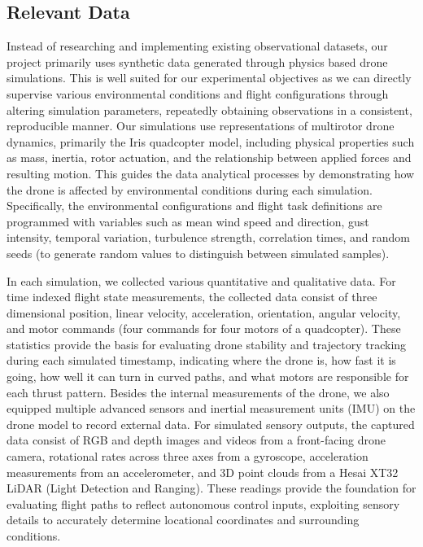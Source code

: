 \documentclass[12pt,letterpaper]{article}
\begin{document}
\subsection{Relevant Data}
Instead of researching and implementing existing observational datasets, our project primarily uses synthetic data generated through physics based drone simulations. This is well suited for our experimental objectives as we can directly supervise various environmental conditions and flight configurations through altering simulation parameters, repeatedly obtaining observations in a consistent, reproducible manner. Our simulations use representations of multirotor drone dynamics, primarily the Iris quadcopter model, including physical properties such as mass, inertia, rotor actuation, and the relationship between applied forces and resulting motion. This guides the data analytical processes by demonstrating how the drone is affected by environmental conditions during each simulation. Specifically, the environmental configurations and flight task definitions are programmed with variables such as mean wind speed and direction, gust intensity, temporal variation, turbulence strength, correlation times, and random seeds (to generate random values to distinguish between simulated samples).

In each simulation, we collected various quantitative and qualitative data. For time indexed flight state measurements, the collected data consist of three dimensional position, linear velocity, acceleration, orientation, angular velocity, and motor commands (four commands for four motors of a quadcopter). These statistics provide the basis for evaluating drone stability and trajectory tracking during each simulated timestamp, indicating where the drone is, how fast it is going, how well it can turn in curved paths, and what motors are responsible for each thrust pattern. Besides the internal measurements of the drone, we also equipped multiple advanced sensors and inertial measurement units (IMU) on the drone model to record external data. For simulated sensory outputs, the captured data consist of RGB and depth images and videos from a front-facing drone camera, rotational rates across three axes from a gyroscope, acceleration measurements from an accelerometer, and 3D point clouds from a Hesai XT32 LiDAR (Light Detection and Ranging). These readings provide the foundation for evaluating flight paths to reflect autonomous control inputs, exploiting sensory details to accurately determine locational coordinates and surrounding conditions. 
\end{document}

